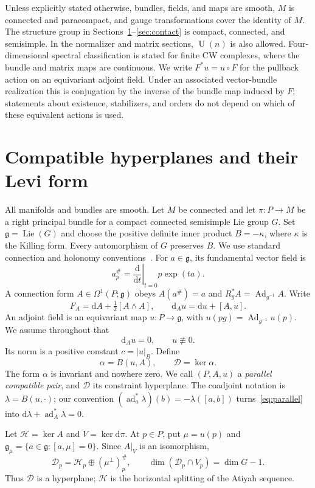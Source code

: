 \documentclass[11pt]{amsart}
\newcommand{\g}{\mathfrak g}
\newcommand{\Ad}{\operatorname{Ad}}
\newcommand{\ad}{\operatorname{ad}}
\newcommand{\U}{\operatorname{U}}
\newcommand{\dd}{\mathrm d}
\theoremstyle{plain}
\theoremstyle{definition}
\theoremstyle{remark}
\begin{document}
Unless explicitly stated otherwise, bundles, fields, and maps are smooth, $M$ is connected and paracompact, and gauge transformations cover the identity of $M$.  The structure group in Sections~\ref{sec:geometry}--\ref{sec:contact} is compact, connected, and semisimple.  In the normalizer and matrix sections, $\U(n)$ is also allowed.  Four-dimensional spectral classification is stated for finite CW complexes, where the bundle and matrix maps are continuous.  We write $F^*u=u\circ F$ for the pullback action on an equivariant adjoint field.  Under an associated vector-bundle realization this is conjugation by the inverse of the bundle map induced by $F$; statements about existence, stabilizers, and orders do not depend on which of these equivalent actions is used.

\section{Compatible hyperplanes and their Levi form}\label{sec:geometry}

All manifolds and bundles are smooth.  Let $M$ be connected and let $\pi:P\to M$ be a right principal bundle for a compact connected semisimple Lie group $G$.  Set $\g=\operatorname{Lie}(G)$ and choose the positive definite inner product $B=-\kappa$, where $\kappa$ is the Killing form.  Every automorphism of $G$ preserves $B$.  We use standard connection and holonomy conventions~\cite{KN}.  For $a\in\g$, its fundamental vector field is
\[
 a_p^\#=\left.\frac{\dd}{\dd t}\right|_{t=0}p\exp(ta).
\]
A connection form $A\in\Omega^1(P;\g)$ obeys $A(a^\#)=a$ and $R_g^*A=\Ad_{g^{-1}}A$.  Write
\[
 F_A=\dd A+\tfrac12[A\wedge A],\qquad
 \dd_Au=\dd u+[A,u].
\]
An adjoint field is an equivariant map $u:P\to\g$, with $u(pg)=\Ad_{g^{-1}}u(p)$.  We assume throughout that
\begin{equation}\label{eq:parallel}
 \dd_Au=0,\qquad u\not\equiv0.
\end{equation}
Its norm is a positive constant $c=|u|_B$.  Define
\begin{equation}
 \alpha=B(u,A),\qquad \mathcal D=\ker\alpha.
\end{equation}
The form $\alpha$ is invariant and nowhere zero.  We call $(P,A,u)$ a \emph{parallel compatible pair}, and $\mathcal D$ its constraint hyperplane.  The coadjoint notation is $\lambda=B(u,\cdot)$; our convention $(\ad_a^*\lambda)(b)=-\lambda([a,b])$ turns~\eqref{eq:parallel} into $\dd\lambda+\ad_A^*\lambda=0$.

Let $\mathcal H=\ker A$ and $V=\ker\dd\pi$.  At $p\in P$, put $\mu=u(p)$ and $\g_\mu=\{a\in\g:[a,\mu]=0\}$.  Since $A|_V$ is an isomorphism,
\begin{equation}\label{eq:hyperplanesplit}
 \mathcal D_p=\mathcal H_p\oplus(\mu^\perp)^\#_p,
 \qquad \dim(\mathcal D_p\cap V_p)=\dim G-1.
\end{equation}
Thus $\mathcal D$ is a hyperplane; $\mathcal H$ is the horizontal splitting of the Atiyah sequence.
\end{document}
